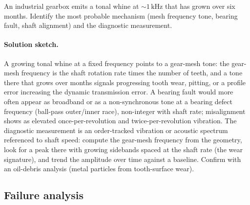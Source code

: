 \begin{exercise}
An industrial gearbox emits a tonal whine at $\sim 1\,\si{\kilo
\hertz}$ that has grown over six months. Identify the most probable
mechanism (mesh frequency tone, bearing fault, shaft alignment) and
the diagnostic measurement.
\paragraph{Solution sketch.} A growing tonal whine at a fixed
frequency points to a gear-mesh tone: the gear-mesh frequency is the
shaft rotation rate times the number of teeth, and a tone there that
grows over months signals progressing tooth wear, pitting, or a
profile error increasing the dynamic transmission error. A bearing
fault would more often appear as broadband or as a non-synchronous
tone at a bearing defect frequency (ball-pass outer/inner race),
non-integer with shaft rate; misalignment shows as elevated
once-per-revolution and twice-per-revolution vibration. The diagnostic
measurement is an order-tracked vibration or acoustic spectrum
referenced to shaft speed: compute the gear-mesh frequency from the
geometry, look for a peak there with growing sidebands spaced at the
shaft rate (the wear signature), and trend the amplitude over time
against a baseline. Confirm with an oil-debris analysis (metal
particles from tooth-surface wear).
\end{exercise}

\subsection*{Failure analysis}

